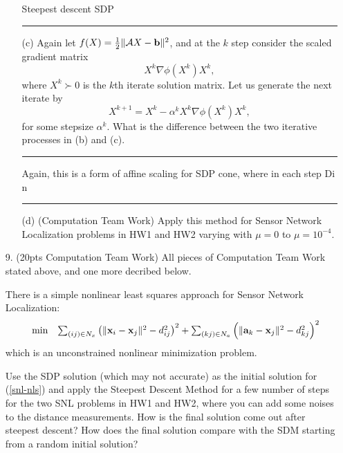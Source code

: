 \documentclass{article} %
\newenvironment{strategy}[1][H]
  { \renewcommand{\algorithmcfname}{}%
   \begin{algorithm}[#1]%
  }{\end{algorithm}}
\renewcommand\a{{\bf a}}
\renewcommand\b{{\bf b}}
\newcommand\x{{\bf x}}
\begin{document}
\begin{enumerate}
\begin{itemize}
 \begin{strategy}
\caption{Steepest descent SDP }
\end{strategy}






\rule{\textwidth}{1pt}



\item[(c)] Again let $f(X)=\frac{1}{2}\|{\cal A}X-\b\|^2$, and at the $k$ step consider the scaled gradient matrix
\[X^k\nabla\phi(X^k)X^k,\]
where $X^k\succ 0$ is the $k$th iterate solution matrix. Let us generate the next iterate by
\[X^{k+1}=X^k-\alpha^kX^k\nabla\phi(X^k)X^k,\]
for some stepsize $\alpha^k$. What is the difference between the two iterative processes in (b) and (c).

\rule{\textwidth}{1pt}


Again, this is a form of affine scaling for SDP cone, where in each step 
Di n



\rule{\textwidth}{1pt}

\item[(d)] (Computation Team Work) Apply this method for Sensor Network Localization problems in HW1 and HW2 varying
with $\mu=0$ to $\mu=10^{-4}$.
\end{itemize}

\item[9.] (20pts Computation Team Work) 
All pieces of Computation Team Work stated above, and one more decribed below.

There is a simple nonlinear least squares approach for Sensor Network Localization:
\begin{equation}\label{snl-nls}
\begin{array}{lll}
&\min        & \sum_{(ij)\in N_x}\left(\|\x_i-\x_j\|^2 - d_{ij}^2\right)^2+\sum_{(kj)\in N_a} \left(\|\a_k-\x_j\|^2 - d_{kj}^2\right)^2
\end{array}
\end{equation}
which is an unconstrained nonlinear minimization problem.

Use the SDP solution (which may not accurate) as the initial solution for (\ref{snl-nls}) and apply the Steepest Descent Method for a few number of steps for the two SNL problems in HW1 and HW2, where you can add some noises to the distance measurements. How is the final solution come out after steepest descent? How does the final solution compare with the SDM starting from a random initial solution?

\end{enumerate}
\end{document}
